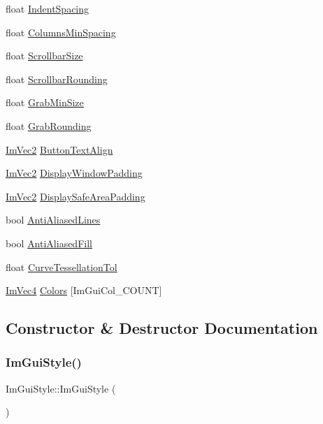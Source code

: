 \begin{DoxyCompactItemize}
\item 
float \hyperlink{struct_im_gui_style_a32ea292dee2b4e178a227acacd061921}{Indent\+Spacing}
\item 
float \hyperlink{struct_im_gui_style_a8fed04481e1d75bb95c97819f545e2ba}{Columns\+Min\+Spacing}
\item 
float \hyperlink{struct_im_gui_style_a96623380e624d2f2ec207449e700a226}{Scrollbar\+Size}
\item 
float \hyperlink{struct_im_gui_style_a00efbadb1ad7daa0ee7384864b147d71}{Scrollbar\+Rounding}
\item 
float \hyperlink{struct_im_gui_style_a04db033d001b343815cdcd2491576ef7}{Grab\+Min\+Size}
\item 
float \hyperlink{struct_im_gui_style_a42369d83032545066803a7db62936e8f}{Grab\+Rounding}
\item 
\hyperlink{struct_im_vec2}{Im\+Vec2} \hyperlink{struct_im_gui_style_a17246b12f4e069229d21808a87f78514}{Button\+Text\+Align}
\item 
\hyperlink{struct_im_vec2}{Im\+Vec2} \hyperlink{struct_im_gui_style_ab06d6f0c6c5f36ab0c14688448de66f6}{Display\+Window\+Padding}
\item 
\hyperlink{struct_im_vec2}{Im\+Vec2} \hyperlink{struct_im_gui_style_a8dd02a6a031ec8667e76aab1e28755bd}{Display\+Safe\+Area\+Padding}
\item 
bool \hyperlink{struct_im_gui_style_a0164b54454297971d40f3578b2c1ffeb}{Anti\+Aliased\+Lines}
\item 
bool \hyperlink{struct_im_gui_style_a1fcc22c258a2a73bd61efd18e7ce7e5a}{Anti\+Aliased\+Fill}
\item 
float \hyperlink{struct_im_gui_style_a41eb9377b63b8b85ab807c28e00198e9}{Curve\+Tessellation\+Tol}
\item 
\hyperlink{struct_im_vec4}{Im\+Vec4} \hyperlink{struct_im_gui_style_a2b4941240a38d1300c39a7fa4f03d0a3}{Colors} \mbox{[}Im\+Gui\+Col\+\_\+\+C\+O\+U\+NT\mbox{]}
\end{DoxyCompactItemize}


\subsection{Constructor \& Destructor Documentation}
\hypertarget{struct_im_gui_style_ab0a3ffb3aeec3e6b09b9bde812b28369}{}\label{struct_im_gui_style_ab0a3ffb3aeec3e6b09b9bde812b28369} 
\subsubsection{\texorpdfstring{Im\+Gui\+Style()}{ImGuiStyle()}}
{\footnotesize\ttfamily Im\+Gui\+Style\+::\+Im\+Gui\+Style (\begin{DoxyParamCaption}{ }\end{DoxyParamCaption})}



